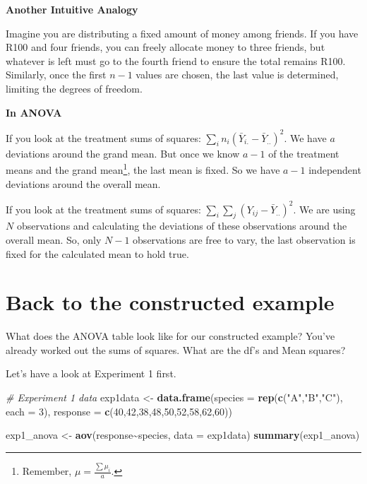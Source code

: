 \documentclass[
  letterpaper,
]{book}
\newenvironment{Shaded}{\begin{snugshade}}{\end{snugshade}}
\newcommand{\AttributeTok}[1]{\textcolor[rgb]{0.13,0.29,0.53}{#1}}
\newcommand{\CommentTok}[1]{\textcolor[rgb]{0.56,0.35,0.01}{\textit{#1}}}
\newcommand{\DecValTok}[1]{\textcolor[rgb]{0.00,0.00,0.81}{#1}}
\newcommand{\FunctionTok}[1]{\textcolor[rgb]{0.13,0.29,0.53}{\textbf{#1}}}
\newcommand{\NormalTok}[1]{#1}
\newcommand{\OtherTok}[1]{\textcolor[rgb]{0.56,0.35,0.01}{#1}}
\newcommand{\SpecialCharTok}[1]{\textcolor[rgb]{0.81,0.36,0.00}{\textbf{#1}}}
\newcommand{\StringTok}[1]{\textcolor[rgb]{0.31,0.60,0.02}{#1}}
\begin{document}
\textbf{Another Intuitive Analogy}

Imagine you are distributing a fixed amount of money among friends. If
you have R100 and four friends, you can freely allocate money to three
friends, but whatever is left must go to the fourth friend to ensure the
total remains R100. Similarly, once the first \(n-1\) values are chosen,
the last value is determined, limiting the degrees of freedom.

\textbf{In ANOVA}

If you look at the treatment sums of squares:
\(\sum_i n_i (\bar{Y}_{i.} - \bar{Y}_{..})^2\). We have \(a\) deviations
around the grand mean. But once we know \(a-1\) of the treatment means
and the grand mean\footnote{Remember, \(\mu = \frac{\sum \mu_i}{a}\).},
the last mean is fixed. So we have \(a-1\) independent deviations around
the overall mean.

If you look at the treatment sums of squares:
\(\sum_i \sum_j (Y_{ij} - \bar{Y}_{..})^2\). We are using \(N\)
observations and calculating the deviations of these observations around
the overall mean. So, only \(N-1\) observations are free to vary, the
last observation is fixed for the calculated mean to hold true.

\section{Back to the constructed
example}\label{back-to-the-constructed-example}

What does the ANOVA table look like for our constructed example? You've
already worked out the sums of squares. What are the df's and Mean
squares?

Let's have a look at Experiment 1 first.

\begin{Shaded}
\begin{Highlighting}[]
\CommentTok{\# Experiment 1 data }
\NormalTok{exp1data }\OtherTok{\textless{}{-}} \FunctionTok{data.frame}\NormalTok{(}\AttributeTok{species =} \FunctionTok{rep}\NormalTok{(}\FunctionTok{c}\NormalTok{(}\StringTok{"A"}\NormalTok{,}\StringTok{"B"}\NormalTok{,}\StringTok{"C"}\NormalTok{), }\AttributeTok{each =} \DecValTok{3}\NormalTok{),}
                       \AttributeTok{response =} \FunctionTok{c}\NormalTok{(}\DecValTok{40}\NormalTok{,}\DecValTok{42}\NormalTok{,}\DecValTok{38}\NormalTok{,}\DecValTok{48}\NormalTok{,}\DecValTok{50}\NormalTok{,}\DecValTok{52}\NormalTok{,}\DecValTok{58}\NormalTok{,}\DecValTok{62}\NormalTok{,}\DecValTok{60}\NormalTok{))}

\NormalTok{exp1\_anova }\OtherTok{\textless{}{-}} \FunctionTok{aov}\NormalTok{(response}\SpecialCharTok{\textasciitilde{}}\NormalTok{species, }\AttributeTok{data =}\NormalTok{ exp1data)}
\FunctionTok{summary}\NormalTok{(exp1\_anova)}
\end{Highlighting}
\end{Shaded}
\end{document}
